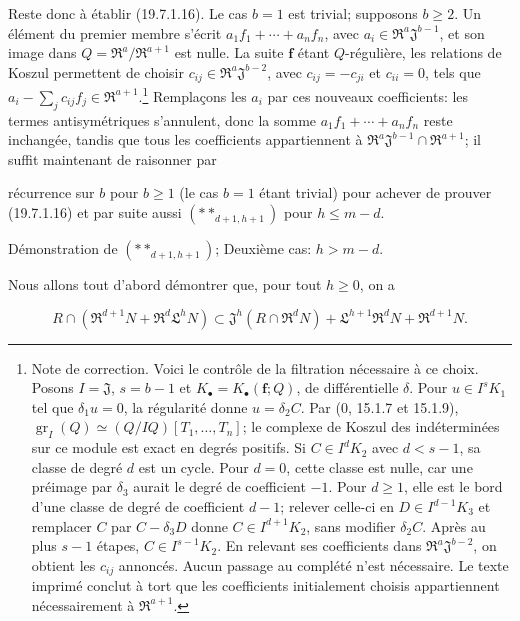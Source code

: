 Reste donc à établir (19.7.1.16). Le cas $b=1$ est trivial; supposons $b\geq2$. Un élément du premier membre s'écrit $a_1f_1+\cdots+a_nf_n$, avec $a_i\in\mathfrak R^a\mathfrak J^{b-1}$, et son image dans $Q=\mathfrak R^a/\mathfrak R^{a+1}$ est nulle. La suite $\mathbf f$ étant $Q$-régulière, les relations de Koszul permettent de choisir $c_{ij}\in\mathfrak R^a\mathfrak J^{b-2}$, avec $c_{ij}=-c_{ji}$ et $c_{ii}=0$, tels que $a_i-\sum_j c_{ij}f_j\in\mathfrak R^{a+1}$.\footnote{Note de correction. Voici le contrôle de la filtration nécessaire à ce choix. Posons $I=\mathfrak J$, $s=b-1$ et $K_\bullet=K_\bullet(\mathbf f;Q)$, de différentielle $\delta$. Pour $u\in I^sK_1$ tel que $\delta_1u=0$, la régularité donne $u=\delta_2C$. Par ($0$, 15.1.7 et 15.1.9), $\operatorname{gr}_I(Q)\simeq(Q/IQ)[T_1,\ldots,T_n]$; le complexe de Koszul des indéterminées sur ce module est exact en degrés positifs. Si $C\in I^dK_2$ avec $d<s-1$, sa classe de degré $d$ est un cycle. Pour $d=0$, cette classe est nulle, car une préimage par $\delta_3$ aurait le degré de coefficient $-1$. Pour $d\geq1$, elle est le bord d'une classe de degré de coefficient $d-1$; relever celle-ci en $D\in I^{d-1}K_3$ et remplacer $C$ par $C-\delta_3D$ donne $C\in I^{d+1}K_2$, sans modifier $\delta_2C$. Après au plus $s-1$ étapes, $C\in I^{s-1}K_2$. En relevant ses coefficients dans $\mathfrak R^a\mathfrak J^{b-2}$, on obtient les $c_{ij}$ annoncés. Aucun passage au complété n'est nécessaire. Le texte imprimé conclut à tort que les coefficients initialement choisis appartiennent nécessairement à $\mathfrak R^{a+1}$.} Remplaçons les $a_i$ par ces nouveaux coefficients: les termes antisymétriques s'annulent, donc la somme $a_1f_1+\cdots+a_nf_n$ reste inchangée, tandis que tous les coefficients appartiennent à $\mathfrak R^a\mathfrak J^{b-1}\cap\mathfrak R^{a+1}$; il suffit maintenant de raisonner par


récurrence sur $b$ pour $b\geq1$ (le cas $b=1$ étant trivial) pour achever de prouver (19.7.1.16) et par suite aussi $(**_{d+1,h+1})$ pour $h\leq m-d$.

\begin{env}[19.7.1.18]
\label{IV.19.7.1.18}
Démonstration de $(**_{d+1,h+1})$; Deuxième cas: $h>m-d$.
\end{env}

Nous allons tout d'abord démontrer que, pour tout $h\geq0$, on a
\begin{env}[19.7.1.19]
\label{IV.19.7.1.19}
\[
  R\cap(\mathfrak R^{d+1}N+\mathfrak R^d\mathfrak L^hN)\subset\mathfrak J^h(R\cap\mathfrak R^dN)+\mathfrak L^{h+1}\mathfrak R^dN+\mathfrak R^{d+1}N.
\]
\end{env}

